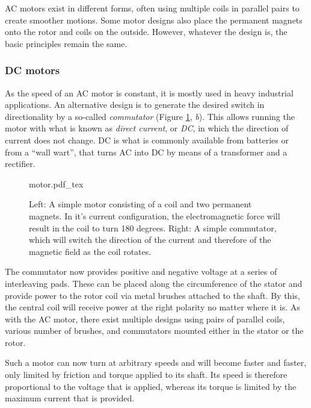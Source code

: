 AC motors exist in different forms, often using multiple coils in parallel pairs to create smoother motions. Some motor designs also place the permanent magnets onto the rotor and coils on the outside. However, whatever the design is, the basic principles remain the same.

\subsubsection{DC motors}

As the speed of an AC motor is constant, it is mostly used in heavy industrial applications. An alternative design is to generate the desired switch in directionality by a so-called \textsl{commutator} (Figure \ref{fig:motor}, \textsl{b}). This allows running the motor with what is known as \textsl{direct current}, or \textsl{DC}, in which the direction of current does not change. DC is what is commonly available from batteries or from a ``wall wart'', that turns AC into DC by means of a transformer and a rectifier.

\begin{figure}
\centering
    \def\svgwidth{\textwidth}
    {motor.pdf_tex}
    \caption{Left: A simple motor consisting of a coil and two permanent magnets. In it's current configuration, the electromagnetic force will result in the coil to turn 180 degrees. Right: A simple commutator, which will switch the direction of the current and therefore of the magnetic field as the coil rotates.}\label{fig:motor}
\end{figure}

The commutator now provides positive and negative voltage at a series of interleaving pads. These can be placed along the circumference of the stator and provide power to the rotor coil via metal brushes attached to the shaft. By this, the central coil will receive power at the right polarity no matter where it is. As with the AC motor, there exist multiple designs using pairs of parallel coils, various number of brushes, and commutators mounted either in the stator or the rotor.

Such a motor can now turn at arbitrary speeds and will become faster and faster, only limited by friction and torque applied to its shaft. Its speed is therefore proportional to the voltage that is applied, whereas its torque is limited by the maximum current that is provided.

